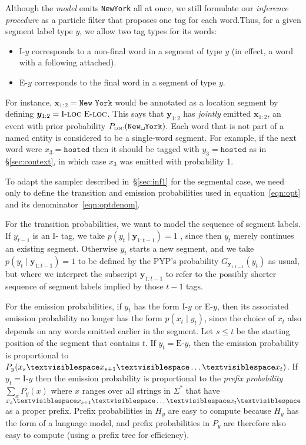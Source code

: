 \documentclass[11pt]{article}
\newcommand{\delim}{\textvisiblespace}
\begin{document}
Although the {\em model} emits \texttt{New{\delim}York} all at once, we still formulate our {\em inference
procedure} as a particle filter that proposes one tag for each word.Thus, for a given segment label type $y$, we allow two tag types for its words:
\begin{itemize}[noitemsep]
\item I-$y$ corresponds to a non-final word in a segment of type $y$ (in effect, a word with a following {\delim} attached).
\item E-$y$ corresponds to the final word in a segment of type $y$.
\end{itemize}
For instance, $\bm{x}_{1:2}=\texttt{New York}$ would be annotated as a location segment by defining $\bm{y}_{1:2}=\text{I-}\textsc{loc} \ \text{E-}\textsc{loc}$.
This says that $\bm{y}_{1:2}$ has {\em jointly} emitted $\bm{x}_{1:2}$, an event with prior probability $P_{\textsc{loc}}(\texttt{New{\delim}York})$.
Each word that is not part of a named entity is considered to be a single-word segment.  For example, if the next word were $x_3=\texttt{hosted}$ then it should be tagged with $y_3=\texttt{hosted}$ as in \S\ref{sec:context}, in which case $x_3$ was emitted with probability 1.

To adapt the sampler described in~\S\ref{sec:inf1} for the segmental case, we need only to define the transition and emission probabilities used in equation~\eqref{eqn:opt} and its denominator~\eqref{eqn:optdenom}.

For the transition probabilities, we want to model the sequence of segment labels.  If $y_{t-1}$ is an I- tag, we take $p(y_t \mid \bm{y}_{1:t-1})=1$ , since then $y_t$ merely continues an existing segment.  Otherwise $y_t$ starts a new segment, and we take $p(y_t \mid \bm{y}_{1:t-1})=1$ to be defined by the PYP's probability $G_{\bm{y}_{1:t-1}}(y_t)$ as usual, but where we interpret the subscript $\bm{y}_{1:t-1}$ to refer to the possibly shorter sequence of segment labels implied by those $t-1$ tags.

For the emission probabilities, if $y_t$ has the form I-$y$ or E-$y$, then its associated emission probability no longer has the form $p(x_t \mid y_t)$, since the choice of $x_t$ also depends on any words emitted earlier in the segment.  Let $s \leq t$ be the starting position of the segment that contains $t$.  If $y_t=\text{E-}y$, then the emission probability is proportional to $P_y(x_s\delim x_{s+1}\delim\ldots\delim x_t)$.  If $y_t=\text{I-}y$ then the emission probability is proportional to the {\em prefix probability} $\sum_x P_y(x)$ where $x$ ranges over all strings in $\Sigma^*$ that have
$x_s\delim x_{s+1}\delim\ldots\delim x_t\delim$ as a proper prefix.  Prefix probabilities in $H_y$ are easy to compute because $H_y$ has the form of a language model, and prefix probabilities in $P_y$ are therefore also easy to compute (using a prefix tree for efficiency).
\end{document}
